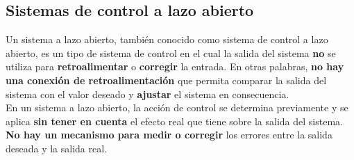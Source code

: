 \documentclass[
	12pt, %
	fleqn, %
	a4paper, %
	oneside, %
]{LegrandOrangeBook}
\begin{document}
\subsection{Sistemas de control a lazo abierto}
Un sistema a lazo abierto, también conocido como sistema de control a lazo abierto, es un tipo de sistema de control en el cual la salida del sistema \textbf{no} se utiliza para \textbf{retroalimentar} o \textbf{corregir} la entrada. En otras palabras, \textbf{no hay una conexión de retroalimentación} que permita comparar la salida del sistema con el valor deseado y \textbf{ajustar} el sistema en consecuencia.\\
En un sistema a lazo abierto, la acción de control se determina previamente y se aplica \textbf{sin tener en cuenta} el efecto real que tiene sobre la salida del sistema. \textbf{No hay un mecanismo para medir o corregir} los errores entre la salida deseada y la salida real.\\
\end{document}
